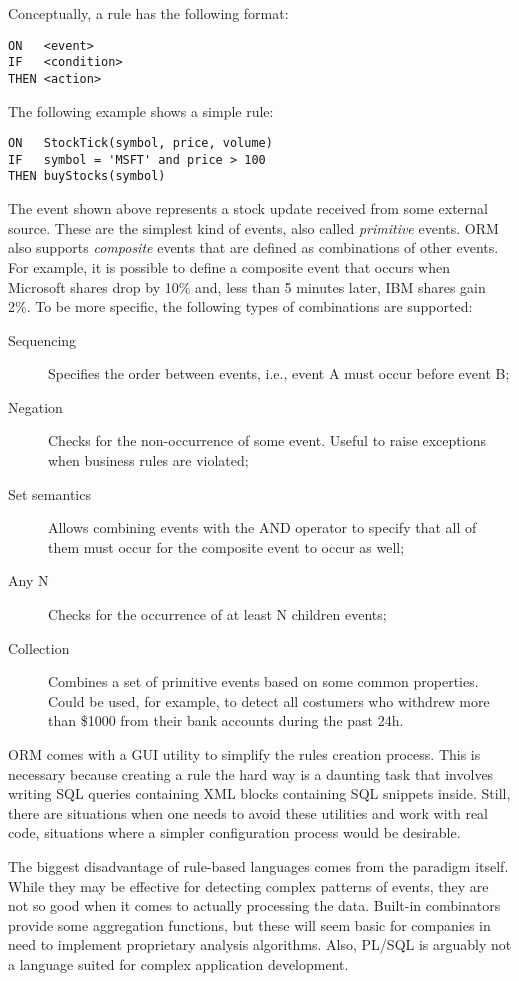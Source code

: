 \documentclass{report}
\begin{document}
Conceptually, a rule has the following format:

\begin{verbatim}
ON   <event>
IF   <condition>
THEN <action>
\end{verbatim}

The following example shows a simple rule:

\begin{verbatim}
ON   StockTick(symbol, price, volume)
IF   symbol = 'MSFT' and price > 100
THEN buyStocks(symbol)
\end{verbatim}

The event shown above represents a stock update received from some
external source. These are the simplest kind of events, also called
\emph{primitive} events. ORM also supports \emph{composite} events
that are defined as combinations of other events. For example, it is
possible to define a composite event that occurs when Microsoft shares
drop by 10\% and, less than 5 minutes later, IBM shares gain 2\%. To
be more specific, the following types of combinations are supported:
\begin{description}
\item [Sequencing] Specifies the order between events, i.e., event A
  must occur before event B;
\item [Negation] Checks for the non-occurrence of some event. Useful
  to raise exceptions when business rules are violated;
\item [Set semantics] Allows combining events with the AND operator to
  specify that all of them must occur for the composite event to occur
  as well;
\item [Any N] Checks for the occurrence of at least N children events;
\item [Collection] Combines a set of primitive events based on some
  common properties. Could be used, for example, to detect all
  costumers who withdrew more than \$1000 from their bank accounts
  during the past 24h.
\end{description}

ORM comes with a GUI utility to simplify the rules creation
process. This is necessary because creating a rule the hard way is a
daunting task that involves writing SQL queries containing XML blocks
containing SQL snippets inside. Still, there are situations when one
needs to avoid these utilities and work with real code, situations
where a simpler configuration process would be desirable.

The biggest disadvantage of rule-based languages comes from the
paradigm itself. While they may be effective for detecting complex
patterns of events, they are not so good when it comes to actually
processing the data. Built-in combinators provide some aggregation
functions, but these will seem basic for companies in need to
implement proprietary analysis algorithms. Also, PL/SQL is arguably
not a language suited for complex application development.
\end{document}
